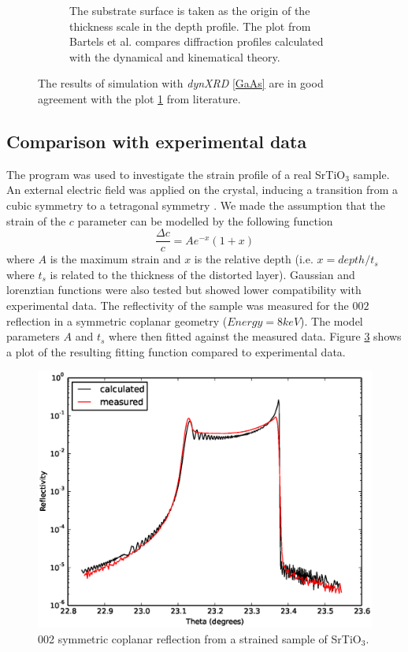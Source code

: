 \documentclass[12pt,oneside,notitlepage,abstracton,a4paper]{scrartcl}
\begin{document}
\begin{figure}[h]
\begin{subfigure}[h]{0.50\textwidth}
  \caption{The substrate surface is taken as the origin of the thickness scale in the depth profile. The plot from Bartels et al. \cite{Bartels:a25435} compares diffraction profiles calculated with the dynamical and kinematical theory.}
  \label{GaAs_article}
 \end{subfigure}
  \caption{The results of simulation with \textit{dynXRD} \ref{GaAs} are in good agreement with the plot \ref{GaAs_article} from literature.
}\label{GaAs_both}
\end{figure}


\subsection{Comparison with experimental data}\label{data}
The program was used to investigate the strain profile of a real SrTiO$ _3$ sample. An external electric field was applied on the crystal, inducing a transition from a cubic symmetry to a tetragonal symmetry \cite{PhysRevB.88.024104}. We made the assumption that the strain of the $c$ parameter can be modelled by the following function
\begin{equation}
 \frac{\Delta c}{c}=A e^{-x}(1+x)
\end{equation}
where $A$ is the maximum strain and $x$ is the relative depth (i.e. $x=depth/t_s$ where $t_s$ is related to the thickness of the distorted layer). Gaussian and lorenztian functions were also tested but showed lower compatibility with experimental data.
The reflectivity of the sample was measured for the $002$ reflection in a symmetric coplanar geometry ($Energy=8 keV$).
The model parameters $A$ and $t_s$ where then fitted against the measured data. Figure \ref{SrTiO3_2} shows a plot of the resulting fitting function compared to experimental data.



\begin{figure}[h]
\begin{center}
\includegraphics[width=\textwidth]{pics/SrTiO3_2.eps}
\caption{002 symmetric coplanar reflection from a strained sample of SrTiO$ _3$.}
\label{SrTiO3_2}
\end{center}
\end{figure}
\end{document}
